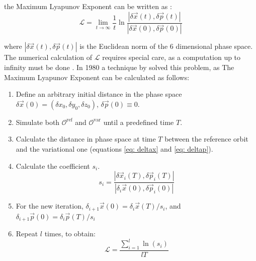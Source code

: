 	the Maximum Lyapunov Exponent can be written as \cite{morbidelli2002modern, munoz2015chaotic}:
	\begin{equation}
		\mathcal{L} = \lim_{t\rightarrow\infty}\dfrac{1}{t}\ln\dfrac{\left|\delta\vec{x}(t), \delta\vec{p}(t)\right|}{\left|\delta\vec{x}(0), \delta\vec{p}(0)\right|}
	\end{equation}
	
	where $|\delta\vec{x}(t), \delta\vec{p}(t)|$ is the Euclidean norm of the 6 dimensional phase space. The numerical calculation of $\mathcal{L}$ requires special care, as a computation up to infinity must be done \cite{morbidelli2002modern}. In 1980 a technique by \citeauthor{benettin1980lyapunov} solved this problem, as The Maximum Lyapunov Exponent can be calculated as follows:
	\begin{enumerate}
		\item Define an arbitrary initial distance in the phase space $\delta\vec{x}(0) = (\delta x_0, \delta y_0, \delta z_0)$, $\delta\vec{p}(0) \equiv 0$.
		\item Simulate both $\mathcal{O}^\text{ref}$ and $\mathcal{O}^\text{var}$ until a predefined time $T$.
		\item Calculate the distance in phase space at time $T$ between the reference orbit and the variational one (equations \ref{eq: deltax} and \ref{eq: deltap}).
		\item Calculate the coefficient $s_i$.
		\begin{equation}
			s_i = \dfrac{\left|\delta\vec{x}_i(T), \delta\vec{p}_i(T)\right|}{\left|\delta_i\vec{x}(0), \delta\vec{p}_i(0)\right|}
		\end{equation}
		\item For the new iteration, $\delta_{i + 1}\vec{x}(0) = \delta_i\vec{x}(T) / s_i$, and $\delta_{i + 1}\vec{p}(0) = \delta_i\vec{p}(T) / s_i$
		\item Repeat $l$ times, to obtain:
		\begin{equation}
			\mathcal{L} = \dfrac{\sum_{i = 1}^l \ln(s_i)}{lT}
		\end{equation}
	\end{enumerate} 
	
